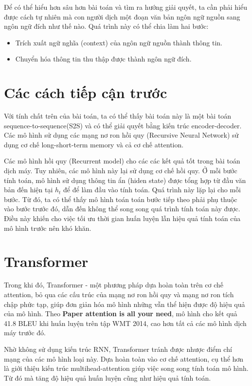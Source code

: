 Để có thể hiểu hơn sâu hơn bài toán và tìm ra hướng giải quyết, ta cần phải hiểu được cách tự nhiên mà con người dịch một đoạn văn bản ngôn ngữ nguồn sang ngôn ngữ đích như thế nào. Quá trình này có thể chia làm hai bước:
\begin{itemize}
	\item Trích xuất ngữ nghĩa (context) của ngôn ngữ nguồn thành thông tin.
	\item Chuyển hóa thông tin thu thập được thành ngôn ngữ đích.
\end{itemize}

\section{Các cách tiếp cận trước}

Với tính chất trên của bài toán, ta có thể thấy bài toán này là một bài toán sequence-to-sequence(S2S) và có thể giải quyết bằng kiến trúc encoder-decoder. Các mô hình sử dụng các mạng nơ ron hồi quy (Recursive Neural Network) sử dụng cơ chế long-short-term memory và cả cơ chế attention.

Các mô hình hồi quy (Recurrent model) cho các các kết quả tốt trong bài toán dịch máy. Tuy nhiên, các mô hình này lại sử dụng cơ chế hồi quy. Ở mỗi bước tính toán, mô hình sử dụng thông tin ẩn (hiden state) được tổng hợp từ đầu văn bản đến hiện tại $h_t$ để để làm đầu vào tính toán. Quá trình này lặp lại cho mỗi bước. Từ đó, ta có thể thấy mô hình toán toán bước tiếp theo phải phụ thuộc vào bước trước đó, dẫn đến không thể song song quá trình tính toán này được. Điều này khiến cho việc tối ưu thời gian huấn luyện lẫn hiệu quả tính toán của mô hình trước nên khó khăn.

\section{Transformer}

Trong khi đó, Transformer - một phương pháp dựa hoàn toàn trên cơ chế attention, bỏ qua các cấu trúc của mạng nơ ron hồi quy và mạng nơ ron tích chập phức tạp, giúp đơn giản hóa mô hình những vẫn thể hiện được độ hiệu quả của mô hình. Theo \textbf{Paper attention is all your need}, mô hình cho kết quả 41.8 BLEU khi huấn luyện trên tập WMT 2014, cao hơn tất cả các mô hình dịch máy trước đó. 

Nhờ không sử dụng kiến trúc RNN, Transformer tránh được nhược điểm chí mạng của các mô hình loại này. Dựa hoàn toàn vào cơ chế attention, cụ thể hơn là giới thiệu kiến trúc multihead-attention giúp việc song song tính toán mô hình. Từ đó mà tăng độ hiệu quả huấn luyện cũng như hiệu quả tính toán.

